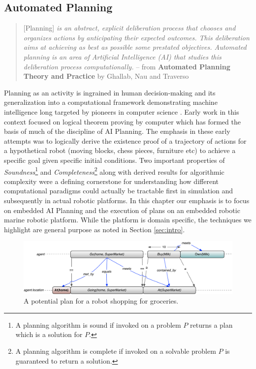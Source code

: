 \subsection{Automated Planning}
\label{sec:planningfound}

{\scriptsize
  \begin{quote} [Planning] \emph{is an abstract, explicit deliberation
      process that chooses and organizes actions by anticipating their
      expected outcomes. This deliberation aims at achieving as best
      as possible some prestated objectives. Automated planning is an
      area of Artificial Intelligence (AI) that studies this
      deliberation process computationally.} -- from \textbf{Automated
      Planning Theory and Practice} by Ghallab, Nau and Traverso
    \cite{ghallab04}
\end{quote}
}

Planning as an activity is ingrained in human decision-making
\cite{berthoz} and its generalization into a computational framework
demonstrating machine intelligence long targeted by pioneers in
computer science \cite{computersthought}. Early work in this context
focused on logical theorem proving by computer \cite{green69} which
has formed the basis of much of the discipline of AI Planning. The
emphasis in these early attempts was to logically derive the existence
proof of a trajectory of actions for a hypothetical robot (moving
blocks, chess pieces, furniture etc) to achieve a specific goal given
specific initial conditions. Two important properties of
\emph{Soundness}\footnote{A planning algorithm is sound if invoked on
  a problem $P$ returns a plan which is a solution for $P$.} and
\emph{Completeness}\footnote{A planning algorithm is complete if
  invoked on a solvable problem $P$ is guaranteed to return a
  solution.} along with derived results for algorithmic complexity
\cite{corman} were a defining cornerstone for understanding how
different computational paradigms could actually be tractable first in
simulation and subsequently in actual robotic platforms. In this
chapter our emphasis is to focus on embedded AI Planning and the
execution of plans on an embedded robotic marine robotic
platform. While the platform is domain specific, the techniques we
highlight are general purpose as noted in Section \ref{sec:intro}.

\begin{figure}[b]
\centering
  \includegraphics[scale=0.35]{figs/shopping_europa.pdf}
  \caption{\small A potential plan for a robot shopping for groceries.}
\label{fig:shop:shopping}
\end{figure}

